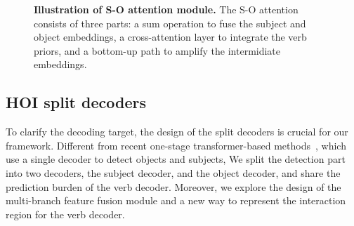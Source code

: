 \documentclass[10pt,twocolumn,letterpaper]{article}
\begin{document}
\begin{figure}[t]
    \centering
    \caption{
        \textbf{Illustration of S-O attention module.}
        The S-O attention consists of three parts: a sum operation to fuse the subject and object embeddings, a cross-attention layer to integrate the verb priors, and a bottom-up path to amplify the intermidiate embeddings.
    }
    \label{fig:so_attn}
\end{figure}

\subsection{HOI split decoders}
\label{sec:split_decoder}
To clarify the decoding target, the design of the split decoders is crucial for our framework.
Different from recent one-stage transformer-based methods~\cite{tamura2021qpic,zhang2021mining,liao2022gen}, which use a single decoder to detect objects and subjects,
We split the detection part into two decoders, the subject decoder, and the object decoder, and share the prediction burden of the verb decoder.
Moreover, we explore the design of the multi-branch feature fusion module and a new way to represent the interaction region for the verb decoder.
\end{document}
